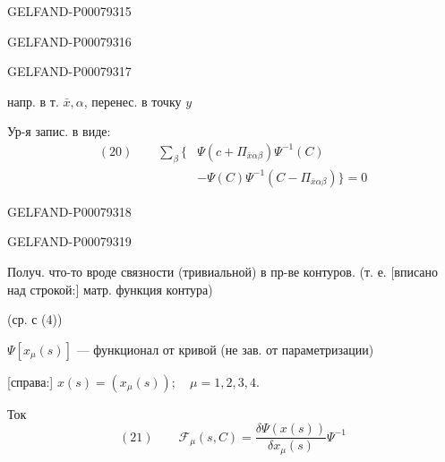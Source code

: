 \begin{GelfandAdjacentEvidence}{GELFAND-P000793}{15}

\end{GelfandAdjacentEvidence}
\begin{GelfandAdjacentEvidence}{GELFAND-P000793}{16}

\end{GelfandAdjacentEvidence}
\begin{GelfandAdjacentEvidence}{GELFAND-P000793}{17}


напр. в т. \(\bar{x},\alpha\), перенес. в точку \(y\)

Ур-я запис. в виде:
\[
\begin{aligned}
(20)\qquad \sum_\beta\bigl\{&
\Psi(c+\Pi_{\bar{x}\alpha\beta})\Psi^{-1}(C)\\
&-\Psi(C)\Psi^{-1}(C-\Pi_{\bar{x}\alpha\beta})\bigr\}=0
\end{aligned}
\]
\end{GelfandAdjacentEvidence}
\begin{GelfandAdjacentEvidence}{GELFAND-P000793}{18}

\end{GelfandAdjacentEvidence}
\begin{GelfandAdjacentEvidence}{GELFAND-P000793}{19}


Получ. что-то вроде связности (тривиальной) в пр-ве контуров.
(т. е. [вписано над строкой:] матр. функция контура)

(ср. с (4))


\(\Psi[x_{\mu}(s)]\) --- функционал от кривой
(не зав. от параметризации)

[справа:] \(x(s)=(x_\mu(s));\quad \mu=1,2,3,4.\)
\end{GelfandAdjacentEvidence}


Ток
\[
(21)\qquad \mathcal{F}_\mu(s,C)=\frac{\delta\Psi(x(s))}{\delta x_\mu(s)}\Psi^{-1}
\]


